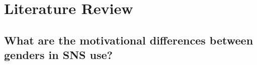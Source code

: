 \section{Literature Review}

\subsection{What are the motivational differences between genders in SNS use?}